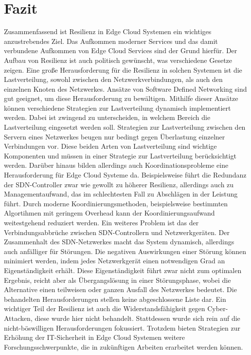 \section{Fazit}

Zusammenfassend ist Resilienz in Edge Cloud Systemen ein wichtiges anzustrebendes Ziel. Das Aufkommen moderner Services und das damit verbundene Aufkommen von Edge Cloud Services sind der Grund hierfür. 
Der Aufbau von Resilienz ist auch politisch gewünscht, was verschiedene Gesetze zeigen. Eine große Herausforderung für die Resilienz in solchen Systemen ist die Lastverteilung, sowohl zwischen den Netzwerkverbindungen, 
als auch den einzelnen Knoten des Netzwerkes. Ansätze von Software Defined Networking sind gut geeignet, um diese Herausforderung zu bewältigen. 
Mithilfe dieser Ansätze können verschiedene Strategien zur Lastverteilung dynamisch implementiert werden. Dabei ist zwingend zu unterscheiden, in welchem Bereich die Lastverteilung eingesetzt werden soll. 
Strategien zur Lastverteilung zwischen den Servern eines Netzwerkes beugen nur bedingt gegen Überlastung einzelner Verbindungen vor. 
Diese beiden Arten von Lastverteilung sind wichtige Komponenten und müssen in einer Strategie zur Lastverteilung berücksichtigt werden. 
Darüber hinaus bilden allerdings auch Koordinationsprobleme eine Herausforderung für Edge Cloud Systeme da. Beispielsweise führt die Redundanz der SDN-Controller zwar wie gewollt zu höherer Resilienz, 
allerdings auch zu Managementaufwand, das im schlechtesten Fall zu Abschlägen in der Leistung führt. Durch moderne Koordinierungsmethoden, 
beispielsweise bestimmten Algortihmen mit geringem Overhead kann der Koordinierungsaufwand weitestgehend reduziert werden. Ein weiteres Problem ist das der Verbindungsabbrüche zwischen SDN-Controllern und Netzwerkgeräten. 
Der Zusammenhalt des SDN-Netzwerkes macht das System dynamisch, allerdings auch anfälliger für Störungen. Die negativen Auswirkungen einer Störung können minimiert werden, 
indem jedes Netzwerkgerät einen notwendigen Grad an Eigenständigkeit erhält. Diese Eigenständigkeit führt zwar nicht zum optimalen Ergebnis, reicht aber als Übergangslösung in einer Störungsphase, 
wobei die Alternative einen teilweisen oder ganzen Ausfall des Netzwerkes bedeutet. Die behandelten Herausforderungen stellen keine abgeschlossene Liste dar. 
Ein wichtiger Teil der Resilienz ist auch die Widerstandsfähigkeit gegen Cyber-Attacken, diese wurde hier nicht behandelt. Stattdessen wurde sich rein auf die nicht-böswilligen Herausforderungen fokussiert. 
Trotzdem bieten Strategien zur Erhöhung der IT-Sicherheit in Edge Cloud Systemen weitere Forschungsschwerpunkte, die in zukünftigen Arbeiten erarbeitet werden können.
